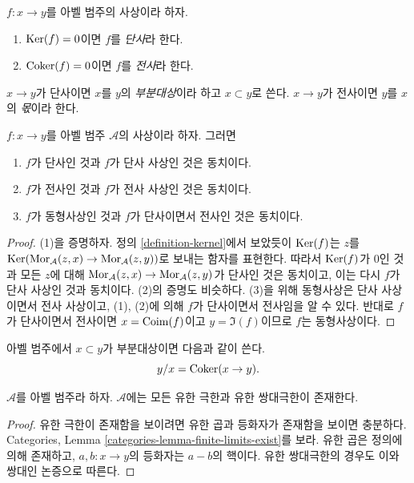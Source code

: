 \begin{definition}
\label{definition-injective-surjective}
$f : x \to y$를 아벨 범주의 사상이라 하자.
\begin{enumerate}
\item $\mathop{\mathrm{Ker}}(f) = 0$이면 $f$를 {\it 단사}라 한다.
\item $\mathop{\mathrm{Coker}}(f) = 0$이면 $f$를 {\it 전사}라 한다.
\end{enumerate}
$x \to y$가 단사이면 $x$를 $y$의 {\it 부분대상}이라 하고
$x \subset y$로 쓴다. $x \to y$가 전사이면 $y$를 $x$의 {\it 몫}이라 한다.
\end{definition}

\begin{lemma}
\label{lemma-characterize-injective}
$f : x \to y$를 아벨 범주 $\mathcal{A}$의 사상이라 하자. 그러면
\begin{enumerate}
\item $f$가 단사인 것과 $f$가 단사 사상인 것은 동치이다.
\item $f$가 전사인 것과 $f$가 전사 사상인 것은 동치이다.
\item $f$가 동형사상인 것과 $f$가 단사이면서 전사인 것은 동치이다.
\end{enumerate}
\end{lemma}

\begin{proof}
(1)을 증명하자. 정의 \ref{definition-kernel}에서 보았듯이 $\mathop{\mathrm{Ker}}(f)$는
$z$를
$\mathop{\mathrm{Ker}}(\mathop{\mathrm{Mor}}\nolimits_\mathcal{A}(z, x) \to \mathop{\mathrm{Mor}}\nolimits_\mathcal{A}(z, y))$로 보내는 함자를
표현한다. 따라서 $\mathop{\mathrm{Ker}}(f)$가 $0$인 것과 모든 $z$에 대해
$\mathop{\mathrm{Mor}}\nolimits_\mathcal{A}(z, x) \to \mathop{\mathrm{Mor}}\nolimits_\mathcal{A}(z, y)$가 단사인 것은 동치이고,
이는 다시 $f$가 단사 사상인 것과 동치이다. (2)의 증명도 비슷하다.
(3)을 위해 동형사상은 단사 사상이면서 전사 사상이고, (1), (2)에 의해
$f$가 단사이면서 전사임을 알 수 있다. 반대로 $f$가 단사이면서 전사이면
$x = \mathop{\mathrm{Coim}}(f)$이고 $y = \Im(f)$이므로 $f$는 동형사상이다.
\end{proof}

\noindent
아벨 범주에서 $x \subset y$가 부분대상이면 다음과 같이 쓴다.
$$
y/x = \mathop{\mathrm{Coker}}(x \to y).
$$

\begin{lemma}
\label{lemma-colimit-abelian-category}
$\mathcal{A}$를 아벨 범주라 하자. $\mathcal{A}$에는 모든 유한 극한과
유한 쌍대극한이 존재한다.
\end{lemma}

\begin{proof}
유한 극한이 존재함을 보이려면 유한 곱과 등화자가 존재함을 보이면 충분하다.
Categories, Lemma \ref{categories-lemma-finite-limits-exist}를 보라.
유한 곱은 정의에 의해 존재하고, $a, b : x \to y$의 등화자는
$a - b$의 핵이다. 유한 쌍대극한의 경우도 이와 쌍대인 논증으로 따른다.
\end{proof}

